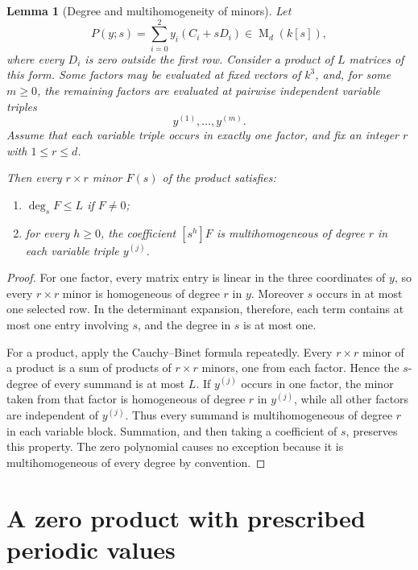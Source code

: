 \documentclass[11pt]{article}
\newtheorem{lemma}[theorem]{Lemma}
\newcommand{\Mat}{\operatorname{M}}
\newcommand{\coeff}[2]{[s^{#1}]#2}
\begin{document}
\begin{lemma}[Degree and multihomogeneity of minors]\label{lem:minor-degree}
Let
\[
P(y;s)=\sum_{i=0}^2y_i(C_i+sD_i)\in\Mat_d(k[s]),
\]
where every $D_i$ is zero outside the first row.  Consider a product of $L$ matrices of this form.  Some factors may be evaluated at fixed vectors of $k^3$, and, for some $m\ge0$, the remaining factors are evaluated at pairwise independent variable triples
\[
y^{(1)},\ldots,y^{(m)}.
\]
Assume that each variable triple occurs in exactly one factor, and fix an integer $r$ with $1\le r\le d$.

Then every $r\times r$ minor $F(s)$ of the product satisfies:
\begin{enumerate}[label=\textup{(\roman*)}]
\item $\deg_sF\le L$ if $F\ne0$;
\item for every $h\ge0$, the coefficient $\coeff{h}{F}$ is multihomogeneous of degree $r$ in each variable triple $y^{(j)}$.
\end{enumerate}
\end{lemma}

\begin{proof}
For one factor, every matrix entry is linear in the three coordinates of $y$, so every $r\times r$ minor is homogeneous of degree $r$ in $y$.  Moreover $s$ occurs in at most one selected row.  In the determinant expansion, therefore, each term contains at most one entry involving $s$, and the degree in $s$ is at most one.

For a product, apply the Cauchy--Binet formula repeatedly.  Every $r\times r$ minor of a product is a sum of products of $r\times r$ minors, one from each factor.  Hence the $s$-degree of every summand is at most $L$.  If $y^{(j)}$ occurs in one factor, the minor taken from that factor is homogeneous of degree $r$ in $y^{(j)}$, while all other factors are independent of $y^{(j)}$.  Thus every summand is multihomogeneous of degree $r$ in each variable block.  Summation, and then taking a coefficient of $s$, preserves this property.  The zero polynomial causes no exception because it is multihomogeneous of every degree by convention.
\end{proof}

\section{A zero product with prescribed periodic values}\label{sec:rank}
\end{document}
